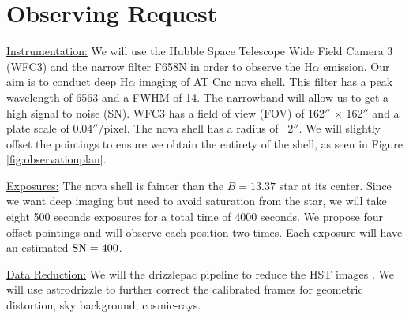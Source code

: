 \documentclass[11pt,a4paper]{article}  %
\begin{document}





\section{Observing Request}
\underline{Instrumentation:}
We will use the Hubble Space Telescope Wide Field Camera 3 (WFC3) and the narrow filter F658N in order to observe the H$\alpha$ emission. Our aim is to conduct deep H$\alpha$ imaging of AT Cnc nova shell. This filter has a peak wavelength of 6563 and a FWHM of 14. The narrowband will allow us to get a high signal to noise (SN). WFC3 has a field of view (FOV) of 162$''$ $\times$ 162$''$ and a plate scale of 0.04$''$/pixel. The nova shell has a radius of ~2$''$. We will slightly offset the pointings to ensure we obtain the entirety of the shell, as seen in Figure \ref{fig:observationplan}. 
\vspace{1mm} \
 \par \noindent \underline{Exposures:} The nova shell is fainter than the $B=13.37$ star at its center. Since we want deep imaging but need to avoid saturation from the star, we will take eight 500 seconds exposures for a total time of 4000 seconds. We propose four offset pointings and will observe each position two times. Each exposure will have an estimated $\rm SN=400$. 
 \vspace{1mm} \
 \par \noindent \underline{Data Reduction:} 
We will the drizzlepac pipeline to reduce the HST images \cite{Avila2015}. We will use astrodrizzle to further correct the calibrated frames for
geometric distortion, sky background, cosmic-rays. 
\end{document}
